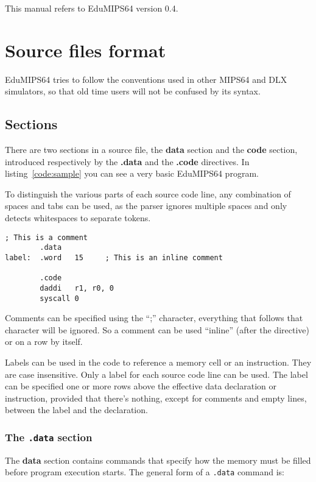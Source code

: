 \documentclass[12pt]{report}
\newcommand{\EM}{EduMIPS64}
\newcommand{\MS}{MIPS64}
\begin{document}

This manual refers to EduMIPS64 version 0.4.

\chapter{Source files format}
\EM{} tries to follow the conventions used in other \MS{} and DLX simulators, so
that old time users will not be confused by its syntax.

\section{Sections}
There are two sections in a source file, the \textbf{data} section and the
\textbf{code} section, introduced respectively by the \textbf{.data} and the
\textbf{.code} directives. In listing~\ref{code:sample} you can see a very basic
\EM{} program.

To distinguish the various parts of each source code line, any combination of
spaces and tabs can be used, as the parser ignores multiple spaces and only
detects whitespaces to separate tokens.

\begin{lstlisting}[caption={Sample \EM{} code}, label={code:sample}, style={mips}]
; This is a comment
        .data
label:  .word   15     ; This is an inline comment

        .code
        daddi   r1, r0, 0
        syscall 0
\end{lstlisting}

\index{;}
Comments can be specified using the ``;'' character, everything that follows
that character will be ignored. So a comment can be used ``inline'' (after the
directive) or on a row by itself.

 Labels can be used in the code to reference a memory cell or an
instruction.  They are case insensitive. Only a label for each source code line
can be used.  The label can be specified one or more rows above the effective
data declaration or instruction, provided that there's nothing, except for
comments and empty lines, between the label and the declaration. 

\subsection{The \texttt{.data} section}
The \textbf{data} section contains commands that specify how the memory must be
filled before program execution starts. The general form of a \texttt{.data} command
is:
\end{document}
